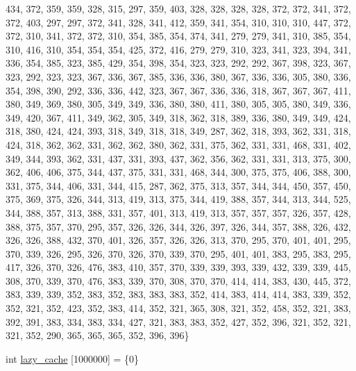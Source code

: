 \begin{DoxyCompactItemize}
434, 372, 359, 359, 328, 315, 297, 359, 403, 328, 328, 328, 328, 372, 372, 341, 372, 372, 403, 297, 297, 372, 341, 328, 341, 412, 359, 341, 354, 310, 310, 310, 447, 372, 372, 310, 341, 372, 372, 310, 354, 385, 354, 374, 341, 279, 279, 341, 310, 385, 354, 310, 416, 310, 354, 354, 354, 425, 372, 416, 279, 279, 310, 323, 341, 323, 394, 341, 336, 354, 385, 323, 385, 429, 354, 398, 354, 323, 323, 292, 292, 367, 398, 323, 367, 323, 292, 323, 323, 367, 336, 367, 385, 336, 336, 380, 367, 336, 336, 305, 380, 336, 354, 398, 390, 292, 336, 336, 442, 323, 367, 367, 336, 336, 318, 367, 367, 367, 411, 380, 349, 369, 380, 305, 349, 349, 336, 380, 380, 411, 380, 305, 305, 380, 349, 336, 349, 420, 367, 411, 349, 362, 305, 349, 318, 362, 318, 389, 336, 380, 349, 349, 424, 318, 380, 424, 424, 393, 318, 349, 318, 318, 349, 287, 362, 318, 393, 362, 331, 318, 424, 318, 362, 362, 331, 362, 362, 380, 362, 331, 375, 362, 331, 331, 468, 331, 402, 349, 344, 393, 362, 331, 437, 331, 393, 437, 362, 356, 362, 331, 331, 313, 375, 300, 362, 406, 406, 375, 344, 437, 375, 331, 331, 468, 344, 300, 375, 375, 406, 388, 300, 331, 375, 344, 406, 331, 344, 415, 287, 362, 375, 313, 357, 344, 344, 450, 357, 450, 375, 369, 375, 326, 344, 313, 419, 313, 375, 344, 419, 388, 357, 344, 313, 344, 525, 344, 388, 357, 313, 388, 331, 357, 401, 313, 419, 313, 357, 357, 357, 326, 357, 428, 388, 375, 357, 370, 295, 357, 326, 326, 344, 326, 397, 326, 344, 357, 388, 326, 432, 326, 326, 388, 432, 370, 401, 326, 357, 326, 326, 313, 370, 295, 370, 401, 401, 295, 370, 339, 326, 295, 326, 370, 326, 370, 339, 370, 295, 401, 401, 383, 295, 383, 295, 417, 326, 370, 326, 476, 383, 410, 357, 370, 339, 339, 393, 339, 432, 339, 339, 445, 308, 370, 339, 370, 476, 383, 339, 370, 308, 370, 370, 414, 414, 383, 430, 445, 372, 383, 339, 339, 352, 383, 352, 383, 383, 383, 352, 414, 383, 414, 414, 383, 339, 352, 352, 321, 352, 423, 352, 383, 414, 352, 321, 365, 308, 321, 352, 458, 352, 321, 383, 392, 391, 383, 334, 383, 334, 427, 321, 383, 383, 352, 427, 352, 396, 321, 352, 321, 321, 352, 290, 365, 365, 365, 352, 396, 396\}
\item 
int \hyperlink{SphereCollatz_8c_09_09_aba3132bccf08623a06d82cb9cf82268e}{lazy\-\_\-cache} \mbox{[}1000000\mbox{]} = \{0\}
\end{DoxyCompactItemize}


